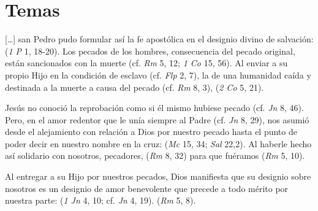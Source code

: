 \newsection
\section{Temas}



\begin{ccebody}


 [\ldots] san Pedro pudo formular así la fe apostólica en el designio divino de salvación:  (\textit{1 P} 1, 18-20). Los pecados de los hombres, consecuencia del pecado original, están sancionados con la muerte (cf. \textit{Rm} 5, 12; \textit{1 Co} 15, 56). Al enviar a su propio Hijo en la condición de esclavo (cf. \textit{Flp} 2, 7), la de una humanidad caída y destinada a la muerte a causa del pecado (cf. \textit{Rm} 8, 3),  (\textit{2 Co} 5, 21).

 Jesús no conoció la reprobación como si él mismo hubiese pecado (cf. \textit{Jn} 8, 46). Pero, en el amor redentor que le unía siempre al Padre (cf. \textit{Jn} 8, 29), nos asumió desde el alejamiento con relación a Dios por nuestro pecado hasta el punto de poder decir en nuestro nombre en la cruz:  (\textit{Mc} 15, 34; \textit{Sal} 22,2). Al haberle hecho así solidario con nosotros, pecadores,  (\textit{Rm} 8, 32) para que fuéramos  (\textit{Rm} 5, 10).


 Al entregar a su Hijo por nuestros pecados, Dios manifiesta que su designio sobre nosotros es un designio de amor benevolente que precede a todo mérito por nuestra parte:  (\textit{1 Jn} 4, 10; cf. \textit{Jn} 4, 19).  (\textit{Rm} 5, 8).


\end{ccebody}
